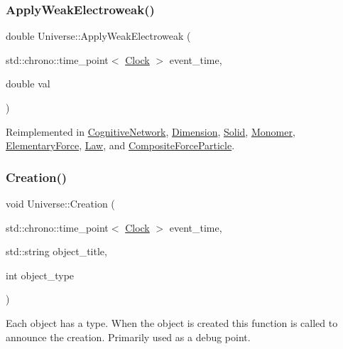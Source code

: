 \subsubsection{\texorpdfstring{Apply\+Weak\+Electroweak()}{ApplyWeakElectroweak()}}
{\footnotesize\ttfamily double Universe\+::\+Apply\+Weak\+Electroweak (\begin{DoxyParamCaption}\item[{std\+::chrono\+::time\+\_\+point$<$ \mbox{\hyperlink{universe_8h_a0ef8d951d1ca5ab3cfaf7ab4c7a6fd80}{Clock}} $>$}]{event\+\_\+time,  }\item[{double}]{val }\end{DoxyParamCaption})\hspace{0.3cm}{\ttfamily [virtual]}}



Reimplemented in \mbox{\hyperlink{classCognitiveNetwork_ab8bc213d2806f0dc49c1284bf934fc24}{Cognitive\+Network}}, \mbox{\hyperlink{classDimension_abf490cabd486afa660f17940ed0d17e6}{Dimension}}, \mbox{\hyperlink{classSolid_ad6c28ec896cbcf64e24a7132a144befd}{Solid}}, \mbox{\hyperlink{classMonomer_a64f65c128ebc2428c42739c930696ea1}{Monomer}}, \mbox{\hyperlink{classElementaryForce_a2d3a5444c771f35d66d4151c62f53b12}{Elementary\+Force}}, \mbox{\hyperlink{classLaw_ae8a5d1d09686d79f7814c8800791460b}{Law}}, and \mbox{\hyperlink{classCompositeForceParticle_a3c1c0b427c633f0685f1d812e02b92ff}{Composite\+Force\+Particle}}.

\mbox{\label{classUniverse_a28615baf47d4558cbe5eebeed6575024}} 
\subsubsection{\texorpdfstring{Creation()}{Creation()}}
{\footnotesize\ttfamily void Universe\+::\+Creation (\begin{DoxyParamCaption}\item[{std\+::chrono\+::time\+\_\+point$<$ \mbox{\hyperlink{universe_8h_a0ef8d951d1ca5ab3cfaf7ab4c7a6fd80}{Clock}} $>$}]{event\+\_\+time,  }\item[{std\+::string}]{object\+\_\+title,  }\item[{int}]{object\+\_\+type }\end{DoxyParamCaption})}

Each object has a type. When the object is created this function is called to announce the creation. Primarily used as a debug point.\mbox{\label{classUniverse_a982502e46868a00a9111738ccc9355c2}} 
